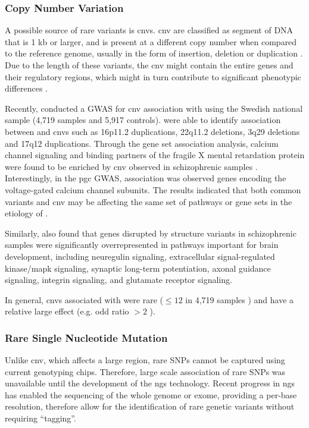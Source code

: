 	\subsubsection{Copy Number Variation}
	A possible source of rare variants is \glspl{cnv}.
	\gls{cnv} are classified as segment of DNA that is 1 \gls{kb} or larger, and is present at a different copy number when compared to the reference genome, usually in the form of insertion, deletion or duplication \citep{Feuk2006}.
	Due to the length of these variants, the \gls{cnv} might contain the entire genes and their regulatory regions, which might in turn contribute to significant phenotypic differences \citep{Feuk2006}.
	
	Recently, \citet{Szatkiewicz2014} conducted a \gls{GWAS} for \gls{cnv} association with  using the Swedish national sample (4,719  samples and 5,917 controls).
	\citet{Szatkiewicz2014} were able to identify association between  and \glspl{cnv} such as 16p11.2 duplications, 22q11.2 deletions, 3q29 deletions and 17q12 duplications.
	Through the gene set association analysis, calcium channel signaling and binding partners of the fragile X mental retardation protein were found to be enriched by \gls{cnv} observed in schizophrenic samples \citep{Szatkiewicz2014}.
	Interestingly, in the \gls{pgc}  \gls{GWAS}, association was observed genes encoding the voltage-gated calcium channel subunits.
	The results indicated that both common variants and \gls{cnv} may be affecting the same set of pathways or gene sets in the etiology of .
	
	Similarly, \citet{Walsh2008} also found that genes disrupted by structure variants in schizophrenic samples were significantly overrepresented in pathways important for brain development, including neuregulin signaling, extracellular signal-regulated kinase/\gls{mapk} signaling, synaptic long-term potentiation, axonal guidance signaling, integrin signaling, and glutamate receptor signaling.
	
	In general, \glspl{cnv} associated with  were rare ($\le12$ in 4,719 samples \citep{Szatkiewicz2014}) and have a relative large effect (e.g. odd ratio $>2$ \citep{Szatkiewicz2014,Walsh2008}).
	
	\subsubsection{Rare Single Nucleotide Mutation}
	Unlike \gls{cnv}, which affects a large region, rare \glspl{SNP} cannot be captured using current genotyping chips.
	Therefore, large scale association of rare \glspl{SNP} was unavailable until the development of the \gls{ngs} technology.
	Recent progress in \gls{ngs} has enabled the sequencing of the whole genome or exome, providing a per-base resolution, therefore allow for the identification of rare genetic variants without requiring ``tagging''.
	
